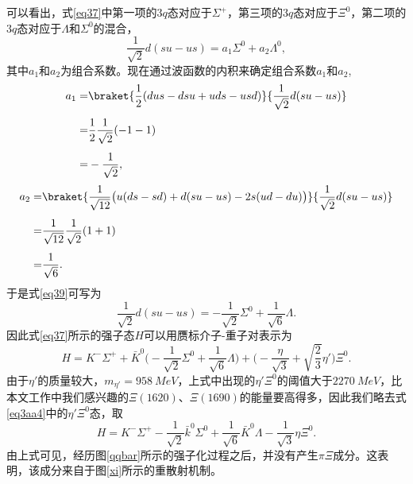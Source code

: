 可以看出，式\eqref{eq37}中第一项的$3q$态对应于$\Sigma^{+}$，第三项的$3q$态对应于$\Xi^{0}$，第二项的$3q$态对应于$\Lambda$和$\Sigma^{0}$的混合，
\vspace{-0.3cm}
\begin{equation}
	\label{eq39}
	\frac{1}{\sqrt{2}}d(su-us)=a_{1}\Sigma^{0}+a_{2}\Lambda^{0},
\end{equation}
\vspace{-0.2cm}
其中$a_{1}$和$a_{2}$为组合系数。现在通过波函数的内积来确定组合系数$a_{1}$和$a_{2}$,
\begin{equation}
\begin{aligned}[b]
	a_{1}=&\braket{\frac{1}{2}(dus-dsu+uds-usd)}{\frac{1}{\sqrt{2}}d(su-us)}\\[1ex]
	=&\frac{1}{2}\frac{1}{\sqrt{2}}(-1-1)\\[1ex]
	=&-\frac{1}{\sqrt{2}},
\end{aligned}
\end{equation}
\begin{equation}
\begin{aligned}[b]
	a_{2}=&\braket{\frac{1}{\sqrt{12}}\big(u(ds-sd)+d(su-us)-2s(ud-du)\big)}{\frac{1}{\sqrt{2}}d(su-us)}\\[1ex]
	=&\frac{1}{\sqrt{12}}\frac{1}{\sqrt{2}}(1+1)\\[1ex]
	=&\frac{1}{\sqrt{6}}.
\end{aligned}
\end{equation}
于是式\eqref{eq39}可写为
\begin{equation}
	\frac{1}{\sqrt{2}}d(su-us)=-\frac{1}{\sqrt{2}}\Sigma^{0}+\frac{1}{\sqrt{6}}\Lambda.
\end{equation}
因此式\eqref{eq37}所示的强子态$H$可以用赝标介子-重子对表示为
\begin{equation}
	\label{eq3aa4}
	H=K^{-}\Sigma^{+}+\bar{K}^{0}\big(-\frac{1}{\sqrt{2}}\Sigma^{0}+\frac{1}{\sqrt{6}}\Lambda\big)+\big(-\frac{\eta}{\sqrt{3}}+\sqrt{\frac{2}{3}}\eta'\big)\Xi^{0}.
\end{equation}
由于$\eta'$的质量较大，$m_{\eta'}=\SI{958}{MeV}$，上式中出现的$\eta'\Xi^0$的阈值大于$\SI{2270}{MeV}$，比本文工作中我们感兴趣的$\Xi(1620)$、$\Xi(1690)$的能量要高得多，因此我们略去式\eqref{eq3aa4}中的$\eta'\Xi^0$态，取
\begin{equation}
\label{first state}
	H=K^{-}\Sigma^{+}-\frac{1}{\sqrt{2}}\bar{k}^{0}\Sigma^{0}+\frac{1}{\sqrt{6}}\bar{K}^{0}\Lambda-\frac{1}{\sqrt{3}}\eta\Xi^{0}.
\end{equation}
由上式可见，经历图\ref{qqbar}所示的强子化过程之后，并没有产生$\pi\Xi$成分。这表明，该成分来自于图\ref{xi}所示的重散射机制。\par
